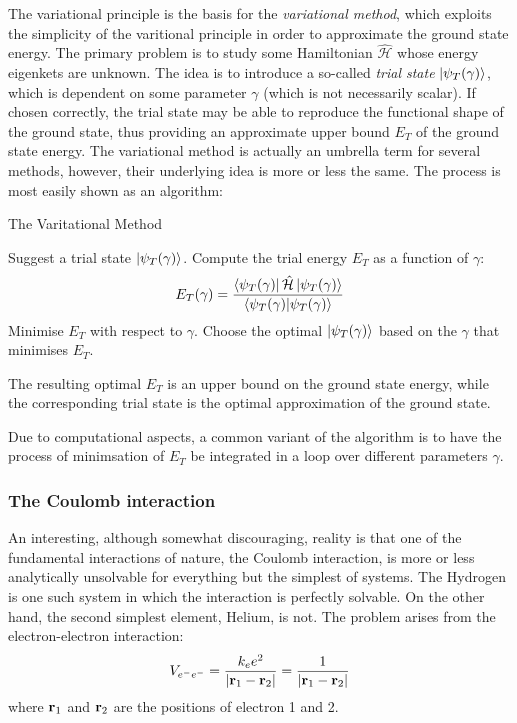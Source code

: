 \documentclass[nofootinbib,reprint,english]{revtex4-1}
\newcommand{\hatHH}{\hat{\mathcal{H}}}
\begin{document}
The variational principle is the basis for the \emph{variational method}, which exploits the simplicity of the varitional principle in order to approximate the ground state energy. The primary problem is to study some Hamiltonian \(\hatHH\) whose energy eigenkets are unknown. The idea is to introduce a so-called \emph{trial state} \(\ket{\psi_T(\gamma)}\), which is dependent on some parameter \(\gamma\) (which is not necessarily scalar). If chosen correctly, the trial state may be able to reproduce the functional shape of the ground state, thus providing an approximate upper bound \(E_T\) of the ground state energy. The variational method is actually an umbrella term for several methods, however, their underlying idea is more or less the same. The process is most easily shown as an algorithm:
\begin{algorithm}[H]
\caption{The Varitational Method}\label{algo:varitational_method}
\begin{algorithmic}[1]
\State Suggest a trial state \(\ket{\psi_T(\gamma)}\).
\State Compute the trial energy \(E_T\) as a function of \(\gamma\):
\[E_T(\gamma)=\frac{\bra{\psi_T(\gamma)}\hatHH\ket{\psi_T(\gamma)}}{\braket{\psi_T(\gamma)}}\]
\State Minimise \(E_T\) with respect to \(\gamma\).
\State Choose the optimal \(\ket{\psi_T(\gamma)}\) based on the \(\gamma\) that minimises \(E_T\).

\noindent The resulting optimal \(E_T\) is an upper bound on the ground state energy, while the corresponding trial state is the optimal approximation of the ground state.
\end{algorithmic}
\end{algorithm}
Due to computational aspects, a common variant of the algorithm is to have the process of minimsation of \(E_T\) be integrated in a loop over different parameters \(\gamma\).
\subsubsection{The Coulomb interaction}
An interesting, although somewhat discouraging, reality is that one of the fundamental interactions of nature, the Coulomb interaction, is more or less analytically unsolvable for everything but the simplest of systems. The Hydrogen is one such system in which the interaction is perfectly solvable. On the other hand, the second simplest element, Helium, is not. The problem arises from the electron-electron interaction:
\begin{equation}\label{eq:electron_electron_Coulomb_interaction}
V_{e^-e^-}=\frac{k_ee^2}{|\vb{r}_1-\vb{r}_2|}=\frac{1}{|\vb{r}_1-\vb{r}_2|}
\end{equation}
where \(\vb{r}_1\) and \(\vb{r}_2\) are the positions of electron 1 and 2.
\end{document}
